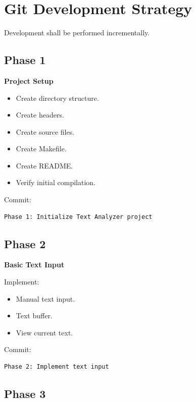 \documentclass[12pt,a4paper]{article}
\begin{document}

\section{Git Development Strategy}

Development shall be performed incrementally.

\subsection{Phase 1}

\textbf{Project Setup}

\begin{itemize}
    \item Create directory structure.
    \item Create headers.
    \item Create source files.
    \item Create Makefile.
    \item Create README.
    \item Verify initial compilation.
\end{itemize}

Commit:

\begin{verbatim}
Phase 1: Initialize Text Analyzer project
\end{verbatim}

\subsection{Phase 2}

\textbf{Basic Text Input}

Implement:

\begin{itemize}
    \item Manual text input.
    \item Text buffer.
    \item View current text.
\end{itemize}

Commit:

\begin{verbatim}
Phase 2: Implement text input
\end{verbatim}

\subsection{Phase 3}
\end{document}
